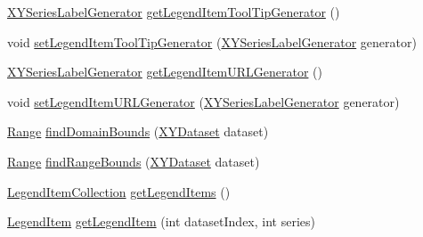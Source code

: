 \begin{DoxyCompactItemize}
\item 
\mbox{\hyperlink{interfaceorg_1_1jfree_1_1chart_1_1labels_1_1_x_y_series_label_generator}{X\+Y\+Series\+Label\+Generator}} \mbox{\hyperlink{classorg_1_1jfree_1_1chart_1_1renderer_1_1xy_1_1_abstract_x_y_item_renderer_a21278a10f7092ac9319851e449f5270b}{get\+Legend\+Item\+Tool\+Tip\+Generator}} ()
\item 
void \mbox{\hyperlink{classorg_1_1jfree_1_1chart_1_1renderer_1_1xy_1_1_abstract_x_y_item_renderer_ab04c5790c9f85263421e49fd9359b98a}{set\+Legend\+Item\+Tool\+Tip\+Generator}} (\mbox{\hyperlink{interfaceorg_1_1jfree_1_1chart_1_1labels_1_1_x_y_series_label_generator}{X\+Y\+Series\+Label\+Generator}} generator)
\item 
\mbox{\hyperlink{interfaceorg_1_1jfree_1_1chart_1_1labels_1_1_x_y_series_label_generator}{X\+Y\+Series\+Label\+Generator}} \mbox{\hyperlink{classorg_1_1jfree_1_1chart_1_1renderer_1_1xy_1_1_abstract_x_y_item_renderer_a61559d4682c3b11772aef0668dd9e982}{get\+Legend\+Item\+U\+R\+L\+Generator}} ()
\item 
void \mbox{\hyperlink{classorg_1_1jfree_1_1chart_1_1renderer_1_1xy_1_1_abstract_x_y_item_renderer_a237e75eddcc381facaf8f3e3b322098b}{set\+Legend\+Item\+U\+R\+L\+Generator}} (\mbox{\hyperlink{interfaceorg_1_1jfree_1_1chart_1_1labels_1_1_x_y_series_label_generator}{X\+Y\+Series\+Label\+Generator}} generator)
\item 
\mbox{\hyperlink{classorg_1_1jfree_1_1data_1_1_range}{Range}} \mbox{\hyperlink{classorg_1_1jfree_1_1chart_1_1renderer_1_1xy_1_1_abstract_x_y_item_renderer_aa663388be3250653a6883e5c1fb4da7e}{find\+Domain\+Bounds}} (\mbox{\hyperlink{interfaceorg_1_1jfree_1_1data_1_1xy_1_1_x_y_dataset}{X\+Y\+Dataset}} dataset)
\item 
\mbox{\hyperlink{classorg_1_1jfree_1_1data_1_1_range}{Range}} \mbox{\hyperlink{classorg_1_1jfree_1_1chart_1_1renderer_1_1xy_1_1_abstract_x_y_item_renderer_a5397cc245f962e8ae07189118297330b}{find\+Range\+Bounds}} (\mbox{\hyperlink{interfaceorg_1_1jfree_1_1data_1_1xy_1_1_x_y_dataset}{X\+Y\+Dataset}} dataset)
\item 
\mbox{\hyperlink{classorg_1_1jfree_1_1chart_1_1_legend_item_collection}{Legend\+Item\+Collection}} \mbox{\hyperlink{classorg_1_1jfree_1_1chart_1_1renderer_1_1xy_1_1_abstract_x_y_item_renderer_a60a84ee4d03aaf31d79d984016ca4fc7}{get\+Legend\+Items}} ()
\item 
\mbox{\hyperlink{classorg_1_1jfree_1_1chart_1_1_legend_item}{Legend\+Item}} \mbox{\hyperlink{classorg_1_1jfree_1_1chart_1_1renderer_1_1xy_1_1_abstract_x_y_item_renderer_ae11b2c6fab0afe8380961a7ecdc03ab3}{get\+Legend\+Item}} (int dataset\+Index, int series)

\end{DoxyCompactItemize}
